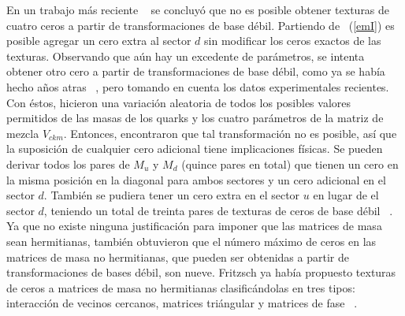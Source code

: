 En un trabajo m\'as reciente ~\cite{Emm200901} se concluy\'o que no es posible 
obtener texturas de cuatro ceros a partir de transformaciones de base d\'ebil.
Partiendo de ~(\ref{emI}) es posible agregar un cero extra al sector $d$ sin
modificar los ceros exactos de las texturas. Observando que a\'un hay un 
excedente de par\'ametros, se intenta obtener otro cero a partir de 
transformaciones de base d\'ebil, como ya se hab\'ia hecho a\~nos atras 
~\cite{Bra199902}, pero tomando en cuenta los datos experimentales recientes. 
Con \'estos, hicieron una variaci\'on aleatoria de todos los posibles valores 
permitidos de las masas de los quarks y los cuatro par\'ametros de la matriz de
mezcla $V_{ckm}$. Entonces, encontraron que tal transformaci\'on no es posible,
as\'i que la suposici\'on de cualquier cero adicional tiene implicaciones 
f\'isicas. Se pueden derivar todos los pares de $M_u$ y $M_d$ (quince pares en
total) que tienen un cero en la misma posici\'on en la diagonal para ambos 
sectores  y un cero adicional en el sector $d$. Tambi\'en se pudiera tener un
cero extra en el sector $u$ en lugar de el sector $d$, teniendo un total de
treinta pares de texturas de ceros de base d\'ebil ~\cite{Emm200901}. Ya que no
existe ninguna justificaci\'on para  
imponer que las matrices de masa sean hermitianas, tambi\'en obtuvieron que 
el n\'umero m\'aximo de ceros en las matrices de masa no hermitianas, que pueden
ser obtenidas a partir de transformaciones de bases d\'ebil, son nueve. Fritzsch
ya hab\'ia propuesto texturas de ceros a matrices de masa no hermitianas 
clasific\'andolas en tres tipos: interacci\'on de vecinos cercanos, matrices 
tri\'angular y matrices de fase ~\cite{Fri200001}. 


